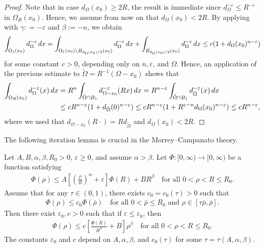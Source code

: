 \documentclass[11pt,reqno]{amsart}
\theoremstyle{plain}
\theoremstyle{definition}
\numberwithin{equation}{section}
\newcommand{\eps}{\varepsilon}
\newcommand{\1}{\mathbbm{1}}
\renewcommand{\d}{\textnormal{\,d}}
\begin{document}
\begin{proof}
Note that in case $d_\Omega(x_0) \geq 2R$, the result is immediate since $d_{\Omega}^{-\eps} \le R^{-\eps}$ in $\Omega_R(x_0)$. Hence, we assume from now on that $d_\Omega(x_0) < 2R$.
    By applying \cite[Lemma B.2.4]{FeRo24} with $\gamma : = -\eps$ and $\beta := -n$, we obtain
    \begin{align*}
        \int_{\Omega_1(x_0)} d^{-\eps}_{\Omega} \d x = \int_{\Omega_1(x_0) \setminus B_{d_{\Omega}(x_0)/2}(x_0)} d^{-\eps}_{\Omega} \d x + \int_{B_{d_{\Omega}(x_0)/2}(x_0)} d^{-\eps}_{\Omega} \d x \le c(1 + d_{\Omega}(x_0)^{n-\eps})
    \end{align*}
    for some constant $c > 0$, depending only on $n,\eps$, and $\Omega$.
    Hence, an application of the previous estimate to $\tilde{\Omega} = R^{-1}(\Omega - x_0)$ shows that
    \begin{align*}
        \int_{\Omega_R(x_0)} d^{-\eps}_{\Omega}(x) \d x &= R^n \int_{\tilde{\Omega} \cap B_1} d^{-\eps}_{\Omega-x_0}(Rx) \d x = R^{n-\eps} \int_{\tilde{\Omega} \cap B_1} d^{-\eps}_{\tilde{\Omega}}(x) \d x \\
        &\le c R^{n-\eps} (1 + d_{\tilde{\Omega}}(0)^{n-\eps}) \le c R^{n-\eps} (1 + R^{\eps - n}d_{\Omega}(x_0)^{n-\eps}) \le c R^{n-\eps},
    \end{align*}
    where we used that $d_{\Omega - x_0}(R \cdot) = R d_{\tilde{\Omega}}$ and $d_{\Omega}(x_0) < 2R$.
\end{proof}

The following iteration lemma is crucial in the Morrey--Campanato theory.

\begin{lemma}
\label{lem-iteration}
    Let $A,B,\alpha,\beta,R_0>0$, $\varepsilon \geq 0$, and assume $\alpha>\beta$.
    Let $\Phi: [0, \infty) \to [0, \infty)$ be a function satisfying
    \begin{align}\label{eq-iteration}
        \Phi(\rho) \leq A \left[ \left(\frac{\rho}{R} \right)^{\alpha} + \varepsilon \right] \Phi(R) + BR^{\beta} \quad\text{for all }0<\rho < R \leq R_0.
    \end{align}
    Assume that for any $\tau \in (0,1)$, there exists $c_0=c_0(\tau)>0$ such that
    \begin{align}\label{eq-almost-incr}
        \Phi(\rho) \leq c_0 \Phi(\bar{\rho}) \quad\text{for all }0 <\bar{\rho} \le R_0 \text{ and } \rho \in [\tau \bar{\rho}, \bar{\rho}].
    \end{align}
    Then there exist $\varepsilon_0,c>0$ such that if $\varepsilon\leq \varepsilon_0$, then
    \begin{align*}
        \Phi(\rho) \leq c \left[ \frac{\Phi(R)}{R^{\beta}} + B \right] \rho^{\beta} \quad\text{for all }0 <\rho<R \leq R_0.
    \end{align*}
    The constants $\varepsilon_0$ and $c$ depend on $A,\alpha,\beta$, and $c_0(\tau)$ for some $\tau=\tau(A,\alpha,\beta)$.
\end{lemma}
\end{document}
